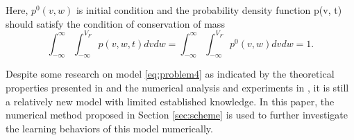 Here, $p^0(v,w)$ is initial condition and the probability density
function p(v, t) should satisfy the condition of conservation of mass
\begin{equation}
    \int_{-\infty}^{\infty} \int_{-\infty}^{V_{F}} p(v, w, t) d v d w=\int_{-\infty}^{\infty} \int_{-\infty}^{V_{F}} p^{0}(v, w) d v d w=1.
\end{equation}



Despite some research on model \eqref{eq:problem4} as indicated by the theoretical properties presented in \cite{perthame2017distributed} and the numerical analysis and experiments in \cite{he2022structure}, it is still a relatively new model with limited established knowledge. In this paper, the numerical method proposed in Section \ref{sec:scheme} is used to further investigate the learning behaviors of this model numerically.

